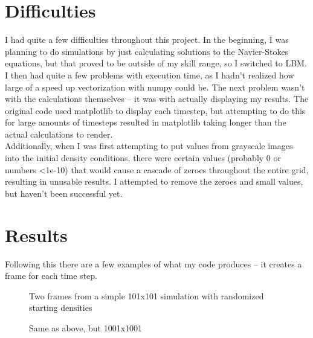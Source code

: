 \documentclass[12pt]{article}
\begin{document}
	\section{Difficulties}
	I had quite a few difficulties throughout this project. In the beginning, I was planning to do simulations by just calculating solutions to the Navier-Stokes equations, but that proved to be outside of my skill range, so I switched to LBM.\\I then had quite a few problems with execution time, as I hadn't realized how large of a speed up vectorization with numpy could be. The next problem wasn't with the calculations themselves -- it was with actually displaying my results. The original code used matplotlib to display each timestep, but attempting to do this for large amounts of timesteps resulted in matplotlib taking longer than the actual calculations to render. \\Additionally, when I was first attempting to put values from grayscale images into the initial density conditions, there were certain values (probably 0 or numbers <1e-10) that would cause a cascade of zeroes throughout the entire grid, resulting in unusable results. I attempted to remove the zeroes and small values, but haven't been successful yet.

	\section{Results}
	Following this there are a few examples of what my code produces -- it creates a frame for each time step.\\
	\begin{figure}[H]%
		\centering
		\qquad
		\caption{Two frames from a simple 101x101 simulation with randomized starting densities}%
		\label{fig:onezeroone}
	\end{figure}%
	\begin{figure}[H]%
		\centering
		\qquad
		\caption{Same as above, but 1001x1001}%
		\label{fig:onezerozeroone}
	\end{figure}%
\end{document}
